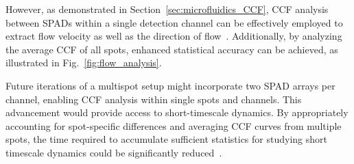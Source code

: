 However, as demonstrated in Section~\ref{sec:microfluidics_CCF}, \ac{CCF} analysis between \ac{SPAD}s within a single detection channel can be effectively employed to extract flow velocity as well as the direction of flow~\cite{brinkmeier_AC_1999}. 
Additionally, by analyzing the average \ac{CCF} of all spots, enhanced statistical accuracy can be achieved, as illustrated in Fig.~\ref{fig:flow_analysis}. 

Future iterations of a multispot setup might incorporate two \ac{SPAD} arrays per channel, enabling \ac{CCF} analysis within single spots and channels. 
This advancement would provide access to short-timescale dynamics. By appropriately accounting for spot-specific differences and averaging \ac{CCF} curves from multiple spots, the time required to accumulate sufficient statistics for studying short timescale dynamics could be significantly reduced~\cite{felekyan_RSI_2005}.
